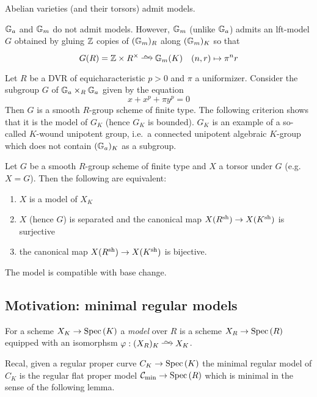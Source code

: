 \documentclass[12pt]{article}
\begin{document}
\begin{cor}
Abelian varieties (and their torsors) admit \Neron models.
\end{cor}

\begin{example}
$\mathbb{G}_a$ and $\mathbb{G}_m$ do not admit \Neron models. However, $\mathbb{G}_m$ (unlike $\mathbb{G}_a$) admits an lft-\Neron model $G$ obtained by gluing $\mathbb{Z}$ copies of $(\mathbb{G}_m)_R$ along $(\mathbb{G}_m)_K$ so that
\[ G(R) = \Z \times R^\times \iso \Gm(K) \quad (n, r) \mapsto \pi^n r \]
\end{example}

\begin{example}
Let $R$ be a DVR of equicharacteristic $p > 0$ and $\pi$ a uniformizer. Consider the subgroup $G$ of $\mathbb{G}_a \times_R \mathbb{G}_a$ given by the equation
\[ x + x^p  + \pi y^p = 0 \]
Then $G$ is a smooth $R$-group scheme of finite type. The following criterion shows that it is the \Neron model of $G_K$ (hence $G_K$ is bounded). $G_K$ is an example of a so-called $K$-wound unipotent group, i.e.\ a connected unipotent algebraic $K$-group which does not contain $(\mathbb{G}_a)_K$ as a subgroup. 
\end{example}

\begin{prop}
Let $G$ be a smooth $R$-group scheme of finite type and $X$ a torsor under $G$ (e.g.\ $X = G$). Then the following are equivalent:
\begin{enumerate}
\item $X$ is a \Neron model of $X_K$
\item $X$ (hence $G$) is separated and the canonical map $X(R^{\mathrm{sh}}) \to X(K^{\mathrm{sh}})$ is surjective
\item the canonical map $X(R^{\mathrm{sh}}) \to X(K^{\mathrm{sh}})$ is bijective.
\end{enumerate}
\end{prop}

\begin{prop}
The \Neron model is compatible with \etale base change. 
\end{prop}

\subsection{Motivation: minimal regular models}

For a scheme $X_K \to \mathrm{Spec}\left( K \right)$ a \textit{model} over $R$ is a scheme $X_R \to \mathrm{Spec}\left( R \right)$ equipped with an isomorphsm $\varphi : (X_R)_K \iso X_K$.

Recal, given a regular proper curve $C_K \to \mathrm{Spec}\left( K \right)$ the minimal regular model of $C_K$ is the regular flat proper model $\mathcal{C}_{\min} \to \mathrm{Spec}\left( R \right)$ which is minimal in the sense of the following lemma.
\end{document}
